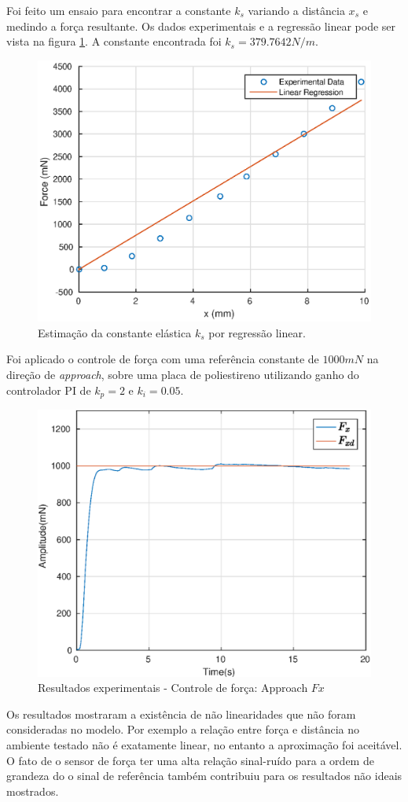 Foi feito um ensaio para encontrar a constante $k_s$ variando a distância $x_s$ e medindo a força resultante. Os dados experimentais e a regressão linear pode ser vista na figura \ref{fig:ks_linreg}. A constante encontrada foi $k_s = 379.7642 N/m$.

\begin{figure}[!ht]
\centering
  \includegraphics[width=0.5\linewidth]{./img/ks_estimation.eps}
  \caption{Estimação da constante elástica $k_s$ por regressão linear.}
  \label{fig:ks_linreg}
\end{figure}%

Foi aplicado o controle de força com uma referência constante de $1000 mN$ na direção de \textit{approach}, sobre uma placa de poliestireno utilizando ganho do controlador PI de $k_p = 2$ e $k_i = 0.05$. 

 \begin{figure}[H]
  \centering
  \includegraphics[width=0.5\linewidth]{./img/force1000_kp2_ki005/Fx.eps}
  \caption{Resultados experimentais - Controle de força: Approach $Fx$}
  \label{fig:force_approach}
\end{figure}

Os resultados mostraram a existência de não linearidades que não foram consideradas no modelo. Por exemplo a relação entre força e distância no ambiente testado não é exatamente linear, no entanto a aproximação foi aceitável. O fato de o sensor de força ter uma alta relação sinal-ruído para a ordem de grandeza do o sinal de referência também contribuiu para os resultados não ideais mostrados. 


